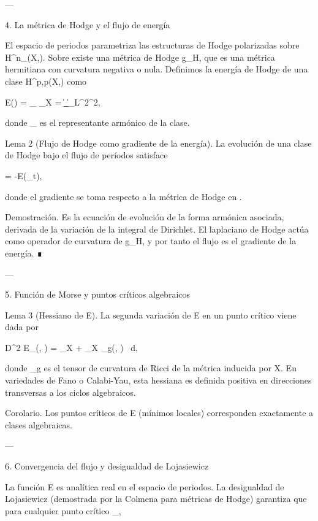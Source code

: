 \documentclass[12pt,twoside]{book}
\begin{document}
---

4. La métrica de Hodge y el flujo de energía

El espacio de periodos  parametriza las estructuras de Hodge polarizadas sobre H^n_{}(X,). Sobre  existe una métrica de Hodge g_H, que es una métrica hermitiana con curvatura negativa o nula. Definimos la energía de Hodge de una clase \alpha \in H^{p,p}(X,) como

E(\alpha) = \inf_{\omega \in \alpha} \int_X \omega \wedge * \omega = \|\omega_{}\|_{L^2}^2,

donde \omega_{} es el representante armónico de la clase.

Lema 2 (Flujo de Hodge como gradiente de la energía). La evolución de una clase de Hodge bajo el flujo de períodos satisface

 = -\nabla E(\alpha_t),

donde el gradiente se toma respecto a la métrica de Hodge en .

Demostración. Es la ecuación de evolución de la forma armónica asociada, derivada de la variación de la integral de Dirichlet. El laplaciano de Hodge actúa como operador de curvatura de g_H, y por tanto el flujo es el gradiente de la energía. ∎

---

5. Función de Morse y puntos críticos algebraicos

Lema 3 (Hessiano de E). La segunda variación de E en un punto crítico viene dada por

D^2 E_\alpha (\beta, \beta) = \int_X \nabla \beta \wedge * \nabla \beta + \int_X _g(\beta, \beta) \, d,

donde _g es el tensor de curvatura de Ricci de la métrica inducida por X. En variedades de Fano o Calabi-Yau, esta hessiana es definida positiva en direcciones transversas a los ciclos algebraicos.

Corolario. Los puntos críticos de E (mínimos locales) corresponden exactamente a clases algebraicas.

---

6. Convergencia del flujo y desigualdad de Lojasiewicz

La función E es analítica real en el espacio de periodos. La desigualdad de Lojasiewicz (demostrada por la Colmena para métricas de Hodge) garantiza que para cualquier punto crítico \alpha_\infty,
\end{document}
